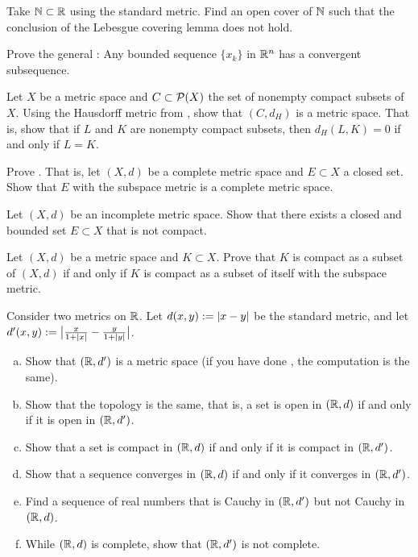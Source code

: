 \begin{exercise}
Take ${\mathbb{N}} \subset {\mathbb{R}}$ using the standard metric.  Find an open cover of ${\mathbb{N}}$
such that the conclusion of the Lebesgue covering lemma does not hold.
\end{exercise}

\begin{exercise}
Prove the general :
Any bounded sequence $\{ x_k
\}$ in ${\mathbb{R}}^n$ has a convergent subsequence.
\end{exercise}

\begin{exercise}
Let $X$ be a metric space and
$C \subset {\mathcal{P}}(X)$ the set of nonempty compact subsets of $X$.
Using the Hausdorff metric from ,
show that $(C,d_H)$ is a metric space.  That is, show that
if $L$ and $K$ are nonempty compact subsets, then $d_H(L,K) = 0$
if and only if $L=K$.
\end{exercise}

\begin{exercise} \label{exercise:closedcomplete}
Prove .  That is,
let $(X,d)$ be a complete metric space and $E \subset X$ a closed set.
Show that $E$ with the subspace metric is a complete metric space.
\end{exercise}

\begin{exercise}
Let $(X,d)$ be an incomplete metric space.  Show that there exists a
closed and bounded set $E \subset X$ that is not compact.
\end{exercise}

\begin{exercise}
Let $(X,d)$ be a metric space and $K \subset X$.
Prove that $K$ is compact as a subset of $(X,d)$ if and only if $K$ is
compact as a subset of itself with the subspace metric.
\end{exercise}

\begin{exercise} \label{exercise:cauchydepndsonmetric}
Consider two metrics on ${\mathbb{R}}$.
Let $d(x,y) := \left\lvert {x-y} \right\rvert$ be the standard metric,
and let
$d'(x,y) := \bigl\lvert \frac{x}{1+\left\lvert {x} \right\rvert} - \frac{y}{1+\left\lvert {y} \right\rvert}
\bigr\rvert$.
\begin{enumerate}[a)]
\item
Show that $({\mathbb{R}},d')$ is a metric space (if you have done
, the computation is the same).
\item
Show that the topology is the same, that is, a set is open in
$({\mathbb{R}},d)$ if and only if it is open in $({\mathbb{R}},d')$.
\item
Show that a set is compact in
$({\mathbb{R}},d)$ if and only if it is compact in $({\mathbb{R}},d')$.
\item
Show that a sequence converges in $({\mathbb{R}},d)$ if and only if
it converges in $({\mathbb{R}},d')$.
\item
Find a sequence of real numbers that is Cauchy
in $({\mathbb{R}},d')$ but not Cauchy in $({\mathbb{R}},d)$.
\item
While $({\mathbb{R}},d)$ is complete, show that $({\mathbb{R}},d')$ is not complete.
\end{enumerate}
\end{exercise}

